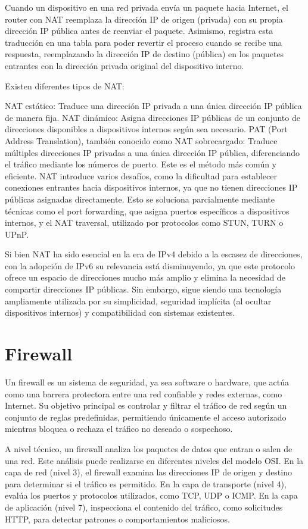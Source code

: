 Cuando un dispositivo en una red privada envía un paquete hacia Internet, el router con NAT reemplaza la dirección IP de origen (privada) con su propia dirección IP pública antes de reenviar el paquete. Asimismo, registra esta traducción en una tabla para poder revertir el proceso cuando se recibe una respuesta, reemplazando la dirección IP de destino (pública) en los paquetes entrantes con la dirección privada original del dispositivo interno.

Existen diferentes tipos de NAT:

NAT estático: Traduce una dirección IP privada a una única dirección IP pública de manera fija.
NAT dinámico: Asigna direcciones IP públicas de un conjunto de direcciones disponibles a dispositivos internos según sea necesario.
PAT (Port Address Translation), también conocido como NAT sobrecargado: Traduce múltiples direcciones IP privadas a una única dirección IP pública, diferenciando el tráfico mediante los números de puerto. Este es el método más común y eficiente.
NAT introduce varios desafíos, como la dificultad para establecer conexiones entrantes hacia dispositivos internos, ya que no tienen direcciones IP públicas asignadas directamente. Esto se soluciona parcialmente mediante técnicas como el port forwarding, que asigna puertos específicos a dispositivos internos, y el NAT traversal, utilizado por protocolos como STUN, TURN o UPnP.

Si bien NAT ha sido esencial en la era de IPv4 debido a la escasez de direcciones, con la adopción de IPv6 su relevancia está disminuyendo, ya que este protocolo ofrece un espacio de direcciones mucho más amplio y elimina la necesidad de compartir direcciones IP públicas. Sin embargo, sigue siendo una tecnología ampliamente utilizada por su simplicidad, seguridad implícita (al ocultar dispositivos internos) y compatibilidad con sistemas existentes.

\section{Firewall}
Un firewall es un sistema de seguridad, ya sea software o hardware, que actúa como una barrera protectora entre una red confiable y redes externas, como Internet. Su objetivo principal es controlar y filtrar el tráfico de red según un conjunto de reglas predefinidas, permitiendo únicamente el acceso autorizado mientras bloquea o rechaza el tráfico no deseado o sospechoso.

A nivel técnico, un firewall analiza los paquetes de datos que entran o salen de una red. Este análisis puede realizarse en diferentes niveles del modelo OSI. En la capa de red (nivel 3), el firewall examina las direcciones IP de origen y destino para determinar si el tráfico es permitido. En la capa de transporte (nivel 4), evalúa los puertos y protocolos utilizados, como TCP, UDP o ICMP. En la capa de aplicación (nivel 7), inspecciona el contenido del tráfico, como solicitudes HTTP, para detectar patrones o comportamientos maliciosos.

